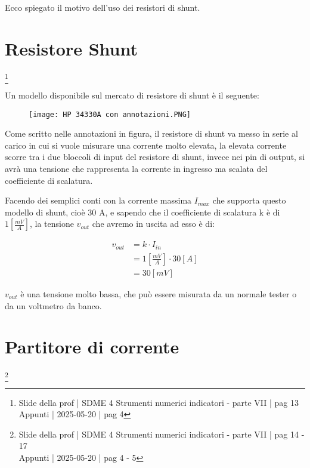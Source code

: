Ecco spiegato il motivo dell'uso dei resistori di shunt. \newline 

\newpage 

\section{Resistore Shunt}
\footnote{Slide della prof | SDME 4 Strumenti numerici indicatori - parte VII | pag 13\\  
Appunti | 2025-05-20 | pag 4 }

Un modello disponibile sul mercato di resistore di shunt è il seguente: 

\begin{figure}[h]
    \centering
    \texttt{[image: HP 34330A con annotazioni.PNG]}
\end{figure}

Come scritto nelle annotazioni in figura, 
il resistore di shunt va messo in serie al carico in cui si vuole misurare una corrente molto elevata, 
la elevata corrente scorre tra i due bloccoli di input del resistore di shunt, 
invece nei pin di output, 
si avrà una tensione che rappresenta la corrente in ingresso ma scalata del coefficiente di scalatura. \newline 

Facendo dei semplici conti con la corrente massima $I_{max}$ che supporta questo modello di shunt, cioè 30 A,
e sapendo che il coefficiente di scalatura k è di $1 \left[\frac{mV}{A} \right]$, 
la tensione $v_{out}$ che avremo in uscita ad esso è di: 

{
    \Large 
    \begin{equation}
        \begin{split}
            v_{out} &= k \cdot I_{in}
            \\
            &= 1 \left[\frac{mV}{A} \right] \cdot 30 [A]
            \\
            &= 30 [mV]
        \end{split}
    \end{equation}
}

$v_{out}$ è una tensione molto bassa, che può essere misurata da un normale tester o da un voltmetro da banco. \newline 

\newpage 

\section{Partitore di corrente}
\footnote{Slide della prof | SDME 4 Strumenti numerici indicatori - parte VII | pag 14 - 17\\  
Appunti | 2025-05-20 | pag 4 - 5 }

